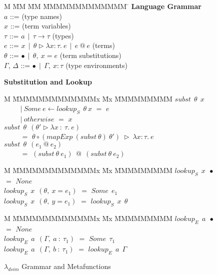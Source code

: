 \begin{figure}[!ht]
\begin{tabbing}
M \= MM        \= MM           \= MMMMMMMMMMMMM \= \kill
\textbf{Language Grammar}
\\[1ex]
   \> $a$       \> ::= \> (type names)
\\[1ex]
   \> $x$       \> ::= \> (term variables)
\\[1ex]
   \> $\tau$    \> ::= 
                \> $a ~~|~~ \tau \to \tau$
                \> (types)
\\[1ex]
   \> $e$       \> ::=
                \> $x ~~|~~ \theta \rhd \lambda x : \tau.~ e ~~|~~ e ~@~ e$
                \> (terms)
\\[1ex]
   \> $\theta$  \> ::=
                \> $\bullet  ~~|~~  \theta,~ x = e$
                \> (term substitutions)
\\[1ex]
   \> $\Gamma$, $\Delta$  
                \> ::= 
                \> $\bullet  ~~|~~  \Gamma,~ x : \tau$
                \> (type environments)
\\[1ex]
\end{tabbing}

\textbf{Substitution and Lookup}
\begin{tabbing}
M  \= MMMMMMMMMMMMMx \= Mx \= MMMMMMMMM \kill
   \> $subst~~ \theta~~ x$
\\
   \> ~~~~ $|~ Some~ e \gets lookup_S~~ \theta~ x$
   \> $=$ \> $e$
\\ \> ~~~~ $|~ otherwise$
   \> $=$ \> $x$
\\[1ex]
   \> $subst~~ \theta~~ (\theta' \rhd \lambda x ~:~ \tau.~ e)$
\\
\> ~~~~ $=$ $\theta \circ (mapExp~ (subst~ \theta)~ \theta') ~\rhd~ \lambda x : \tau.~ e$
\\[1ex]
   \> $subst~~ \theta~~ (e_1 ~@~ e_2)$
\\
\> ~~~~ $=$ $(subst~ \theta~ e_1) ~~@~~ (subst~ \theta~ e_2)$
\end{tabbing}
\begin{tabbing}
M  \= MMMMMMMMMMMMMx \= Mx \= MMMMMMMMM \kill
   \> $lookup_S~~ x~~ \bullet$ 
   \> $=$
   \> $None$  
\\
   \> $lookup_S~~ x~~ (\theta,~ x = e_1)$
   \> $=$
   \> $Some~~ e_1$  
\\
   \> $lookup_S~~ x~~ (\theta,~ y = e_1)$
   \> $=$
   \> $lookup_S~~ x~~ \theta$
\end{tabbing}
\begin{tabbing}
M  \= MMMMMMMMMMMMMx \= Mx \= MMMMMMMMM \kill
   \> $lookup_E~~ a~~ \bullet$ 
   \> $=$
   \> $None$  
\\
   \> $lookup_E~~ a~~ (\Gamma,~ a ~:~ \tau_1)$
   \> $=$
   \> $Some~~ \tau_1$  
\\
   \> $lookup_E~~ a~~ (\Gamma,~ b ~:~ \tau_1)$
   \> $=$
   \> $lookup_E~~ a~~ \Gamma$
\end{tabbing}
\caption{$\lambda_{dsim}$ Grammar and Metafunctions}
\label{f:grammar}
\end{figure}




